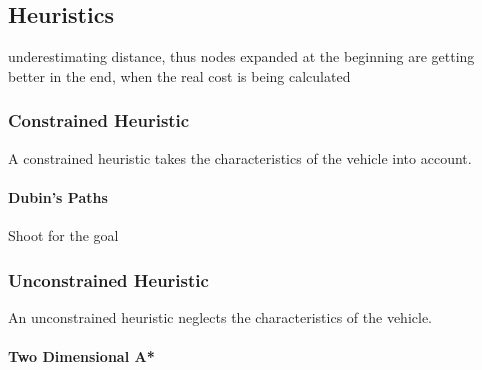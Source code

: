 \subsection{Heuristics}
underestimating distance, thus nodes expanded at the beginning are getting better in the end, when the real cost is being calculated
\subsubsection{Constrained Heuristic}
A constrained heuristic takes the characteristics of the vehicle into account.
\paragraph{Dubin's Paths}
Shoot for the goal
\subsubsection{Unconstrained Heuristic}
An unconstrained heuristic neglects the characteristics of the vehicle.
\paragraph{Two Dimensional A*}